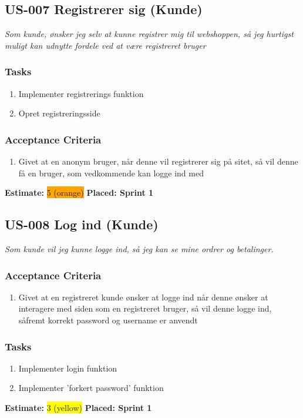 \subsection{US-007 Registrerer sig (Kunde)}
\label{sec:US-007}
\textit{Som kunde, ønsker jeg selv at kunne registrer mig til webshoppen, så jeg hurtigst muligt kan udnytte fordele ved at være registreret bruger}
\subsubsection*{\textbf{Tasks}}
\begin{enumerate}
  \item Implementer registrerings funktion
  \item Opret registreringsside
\end{enumerate}
\subsubsection*{\textbf{Acceptance Criteria}}
\begin{enumerate}
  \item Givet at en anonym bruger, når denne vil registrerer sig på sitet, så vil denne få en bruger, som vedkommende kan logge ind med
\end{enumerate}
\textbf{Estimate:} \colorbox{orange}{5 (orange)}
\textbf{Placed: Sprint 1}
\par\noindent\dotfill

\subsection{US-008 Log ind (Kunde)}
\label{sec:US-008}
\textit{Som kunde vil jeg kunne logge ind, så jeg kan se mine ordrer og betalinger.}
\subsubsection*{\textbf{Acceptance Criteria}}
\begin{enumerate}
  \item Givet at en registreret kunde ønsker at logge ind når denne ønsker at interagere med siden som en registreret bruger, så vil denne logge ind, såfremt korrekt password og username er anvendt
\end{enumerate}
\subsubsection*{\textbf{Tasks}}
\begin{enumerate}
  \item Implementer login funktion
  \item Implementer 'forkert password' funktion
\end{enumerate}
\textbf{Estimate:} \colorbox{yellow}{3 (yellow)}
\textbf{Placed: Sprint 1}
\par\noindent\dotfill

